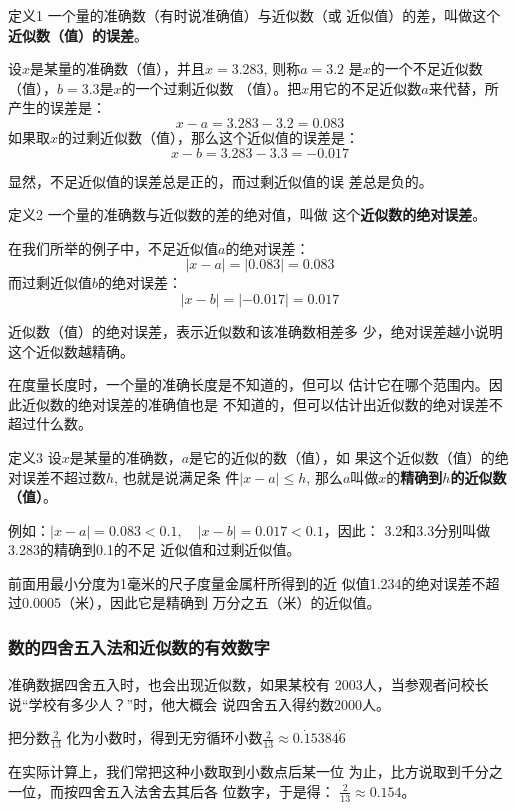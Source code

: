 \begin{blk}{定义1}
    一个量的准确数（有时说准确值）与近似数（或
    近似值）的差，叫做这个\textbf{近似数（值）的误差}。
\end{blk}


设$x$是某量的准确数（值），并且$x=3.283$, 则称$a=3.2$
是$x$的一个不足近似数（值），$b=3.3$是$x$的一个过剩近似数
（值）。把$x$用它的不足近似数$a$来代替，所产生的误差是：
\[x-a=3.283-3.2=0.083\]
如果取$x$的过剩近似数（值），那么这个近似值的误差是：
\[x-b=3.283-3.3=-0.017\]

显然，不足近似值的误差总是正的，而过剩近似值的误
差总是负的。

\begin{blk}{定义2 }
    一个量的准确数与近似数的差的绝对值，叫做
这个\textbf{近似数的绝对误差}。
\end{blk}


在我们所举的例子中，不足近似值$a$的绝对误差：
\[|x-a|=|0.083|=0.083\]
而过剩近似值$b$的绝对误差：
\[|x-b|=|-0.017|=0.017\]

近似数（值）的绝对误差，表示近似数和该准确数相差多
少，绝对误差越小说明这个近似数越精确。

在度量长度时，一个量的准确长度是不知道的，但可以
估计它在哪个范围内。因此近似数的绝对误差的准确值也是
不知道的，但可以估计出近似数的绝对误差不超过什么数。

\begin{blk}{定义3}
    设$x$是某量的准确数，$a$是它的近似的数（值），如
    果这个近似数（值）的绝对误差不超过数$h$, 也就是说满足条
    件$|x-a|\le h$, 那么$a$叫做$x$的\textbf{精确到$h$的近似数（值）}。    
\end{blk}

例如：$|x-a|=0.083<0.1,\quad |x-b|=0.017<0.1$，因此：
3.2和3.3分别叫做3.283的精确到0.1的不足
近似值和过剩近似值。

前面用最小分度为1毫米的尺子度量金属杆所得到的近
似值1.234的绝对误差不超过0.0005（米），因此它是精确到
万分之五（米）的近似值。

\subsubsection{数的四舍五入法和近似数的有效数字}
准确数据四舍五入时，也会出现近似数，如果某校有
2003人，当参观者问校长说“学校有多少人？”时，他大概会
说四舍五入得约数2000人。

把分数$\frac{2}{13}$
化为小数时，得到无穷循环小数$\frac{2}{13}\approx 0.\dot{1}5384\dot{6}$

在实际计算上，我们常把这种小数取到小数点后某一位
为止，比方说取到千分之一位，而按四舍五入法舍去其后各
位数字，于是得：
$\frac{2}{13}\approx 0.154$。

